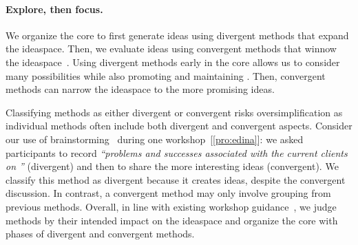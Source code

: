 
\paragraph{Explore, then focus.} We organize the core to first generate ideas using divergent methods that expand the ideaspace. Then, we evaluate ideas using convergent methods that winnow the ideaspace~\cite{Osborn1953}. Using divergent methods early in the core allows us to consider many possibilities while also promoting \agency and maintaining \interest. Then, convergent methods can narrow the ideaspace to the more promising ideas. 

Classifying methods as either divergent or convergent risks oversimplification as individual methods often include both divergent and convergent aspects. Consider our use of brainstorming~\cite{Osborn1953} during one workshop~[\ref{pro:edina}]: we asked participants to record \emph{``problems and successes associated with the current clients on \stickyNotes''} (divergent) and then to share the more interesting ideas (convergent). We classify this method as divergent because it creates ideas, despite the convergent discussion. In contrast, a convergent method may only involve grouping \stickyNotes from previous methods. Overall, in line with existing workshop guidance~\cite{CreativeEducationFoundation2015,DeBono1983,Hamilton2016,Osborn1953}, we judge methods by their intended impact on the ideaspace and organize the core with phases of divergent and convergent methods.

